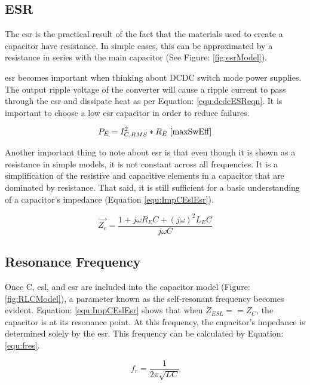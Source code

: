 \subsection{ESR}
\label{sec:ESR}

The \gls{esr} is the practical result of the fact that the materials used to create a capacitor have resistance. In simple cases, this can be approximated by a resistance in series with the main capacitor (See Figure: \ref{fig:esrModel}).

\gls{esr} becomes important when thinking about DCDC switch mode power supplies. The output ripple voltage of the converter will cause a ripple current to pass through the \gls{esr} and dissipate heat as per Equation: \eqref{equ:dcdcESReqn}. It is important to choose a low \gls{esr} capacitor in order to reduce failures.

\begin{equation}
\label{equ:dcdcESReqn}
P_E = I_{C,RMS}^2 * R_E
~\cite{maxSwEff}
\end{equation}

Another important thing to note about \gls{esr} is that even though it is shown as a resistance in simple models, it is not constant across all frequencies. It is a simplification of the resistive and capacitive elements in a capacitor that are dominated by resistance. That said, it is still sufficient for a basic understanding of a capacitor's impedance (Equation \eqref{equ:ImpCEslEsr}).

\begin{equation}
\label{equ:ImpCEslEsr}
\vec{Z_c} = \frac{1 + j\omega R_EC + (j\omega)^2L_EC}{j\omega C}
\end{equation}

\subsection{Resonance Frequency}


Once C, \gls{esl}, and \gls{esr} are included into the capacitor model (Figure: \ref{fig:RLCModel}), a parameter known as the self-resonant frequency becomes evident. Equation: \eqref{equ:ImpCEslEsr} shows that when $Z_{ESL} == Z_C$, the capacitor is at its resonance point. At this frequency, the capacitor's impedance is determined solely by the \gls{esr}. This frequency can be calculated by Equation: \eqref{equ:fres}.

\begin{equation}
\label{equ:fres}
f_r = \frac{1}{2\pi \sqrt{LC}}
\end{equation}

